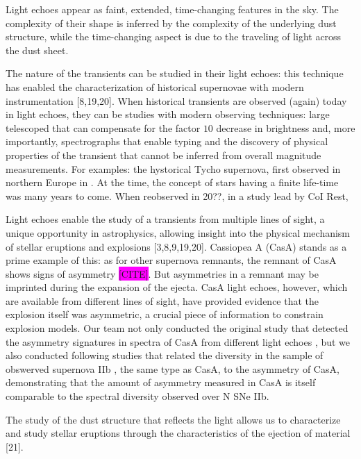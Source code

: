 \documentclass{proposalnsf}
\newcommand{\changeit}[1]{\colorbox{magenta}{#1}}
\begin{document}
Light echoes appear as faint, extended, time-changing features in the sky. The complexity of their shape is inferred by the complexity of the underlying dust structure, while the time-changing aspect is due to the traveling of light across the dust sheet.


The nature of the transients can be studied in their light echoes: this technique has enabled the characterization of historical supernovae with modern instrumentation [8,19,20]. When historical transients are observed (again) today in light echoes, they can be studies with modern observing techniques: large telescoped that can compensate for the factor $10$ decrease in brightness and, more importantly, spectrographs that enable typing and the discovery of physical properties of the transient that cannot be inferred from overall magnitude measurements. For examples: the hystorical Tycho supernova, first observed in northern Europe in . At the time, the concept of stars having a finite life-time was many years to come. When reobserved in 20??, in a study lead by CoI Rest, 


Light echoes enable the study of a transients from multiple lines of sight, a unique opportunity in astrophysics, allowing insight into the physical mechanism of stellar eruptions and explosions [3,8,9,19,20]. Cassiopea A (CasA) stands as a prime example of this: as for other supernova remnants, the remnant of CasA shows signs of asymmetry \changeit{[CITE]}. But asymmetries in a remnant may be imprinted during the expansion of the ejecta. CasA light echoes, however, which are available from different lines of sight, have provided evidence that the explosion itself was asymmetric, a crucial piece of information to constrain explosion models. Our team not only conducted the original study that detected the asymmetry signatures in spectra of CasA from different light echoes \tochange[RESTCASA], but we also conducted following studies that related the diversity in the sample of obswerved supernova IIb \tochange[Finn], the same type as CasA, to the asymmetry of CasA, demonstrating that the amount of asymmetry measured in CasA is itself comparable to the spectral diversity observed over N SNe IIb.




The study of the dust structure that reflects the light allows us to characterize and study stellar eruptions through the characteristics of the ejection of material [21].
\end{document}
